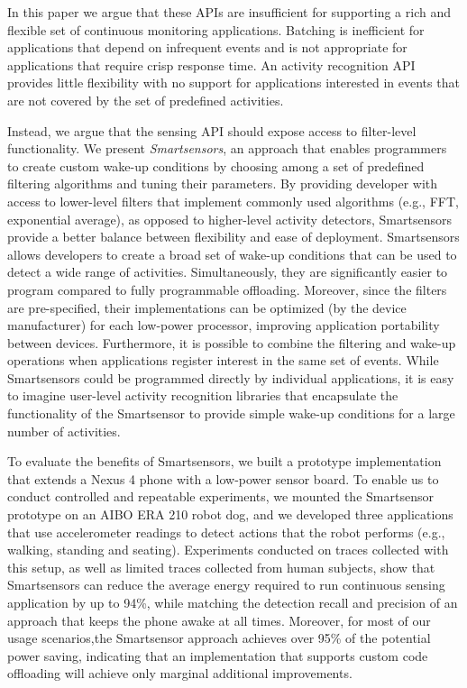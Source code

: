 In this paper we argue that these APIs are insufficient for supporting
a rich and flexible set of continuous monitoring applications.
Batching is inefficient for applications that depend on infrequent
events and is not appropriate for applications that require crisp
response time.  An activity recognition API provides little
flexibility with no support for applications interested in events that
are not covered by the set of predefined activities.  

Instead, we argue that the sensing API should expose access to
filter-level functionality.  We present {\em Smartsensors}, an
approach that enables programmers to create custom wake-up conditions
by choosing among a set of predefined filtering algorithms and tuning
their parameters.  By providing developer with access to lower-level
filters that implement commonly used algorithms (e.g., FFT,
exponential average), as opposed to higher-level activity detectors,
Smartsensors provide a better balance between flexibility and ease of
deployment.  Smartsensors allows developers to create a broad set of
wake-up conditions that can be used to detect a wide range of
activities.  Simultaneously, they are significantly easier to program
compared to fully programmable offloading.  Moreover, since the
filters are pre-specified, their implementations can be optimized (by
the device manufacturer) for each low-power processor, improving
application portability between devices.  Furthermore, it is possible
to combine the filtering and wake-up operations when applications
register interest in the same set of events.  While Smartsensors could
be programmed directly by individual applications, it is easy to
imagine user-level activity recognition libraries that encapsulate the
functionality of the Smartsensor to provide simple wake-up conditions
for a large number of activities.

To evaluate the benefits of Smartsensors, we built a prototype
implementation that extends a Nexus 4 phone with a low-power sensor
board.  To enable us to conduct controlled and repeatable experiments,
we mounted the Smartsensor prototype on an AIBO ERA 210 robot dog, and
we developed three applications that use accelerometer readings to
detect actions that the robot performs (e.g., walking, standing and
seating).  Experiments conducted on traces collected with this setup,
as well as limited traces collected from human subjects, show that
Smartsensors can reduce the average energy required to run continuous
sensing application by up to 94\%, while matching the detection recall
and precision of an approach that keeps the phone awake at all times.
Moreover, for most of our usage scenarios,the Smartsensor approach
achieves over 95\% of the potential power saving, indicating that an
implementation that supports custom code offloading will
achieve only marginal additional improvements.

